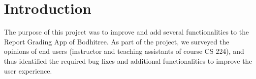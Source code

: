 \section{Introduction}
The purpose of this project was to improve and add several functionalities to the Report Grading App of Bodhitree. As part of the project, we surveyed the opinions of end users (instructor and teaching assistants of course CS 224), and thus identified the required bug fixes and additional functionalities to improve the user experience.

